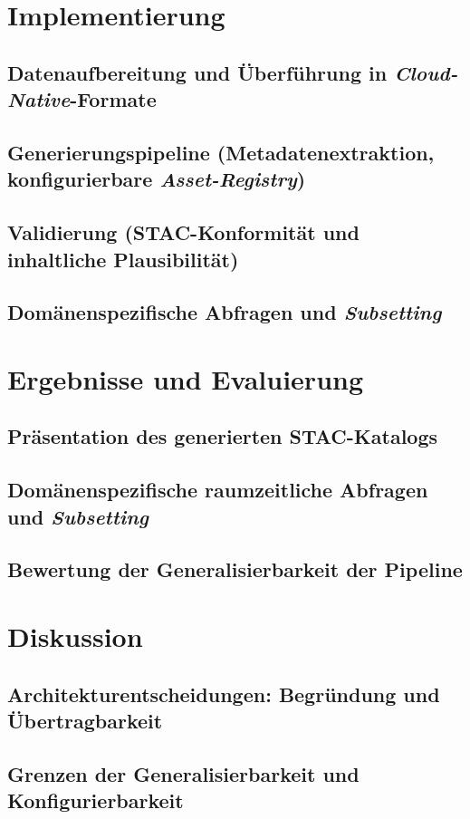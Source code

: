 \documentclass[12pt, a4paper, bibliography=totoc, listof=totoc]{scrreprt}
\begin{document}
\chapter{Implementierung}
\section{Datenaufbereitung und Überführung in \textit{Cloud-Native}-Formate}
\section{Generierungspipeline (Metadatenextraktion, konfigurierbare \textit{Asset-Registry})}
\section{Validierung (STAC-Konformität und inhaltliche Plausibilität)}
\section{Domänenspezifische Abfragen und \textit{Subsetting}}

\chapter{Ergebnisse und Evaluierung}
\section{Präsentation des generierten STAC-Katalogs}
\section{Domänenspezifische raumzeitliche Abfragen und \textit{Subsetting}}
\section{Bewertung der Generalisierbarkeit der Pipeline}

\chapter{Diskussion}
\section{Architekturentscheidungen: Begründung und Übertragbarkeit}
\section{Grenzen der Generalisierbarkeit und Konfigurierbarkeit}
\end{document}
